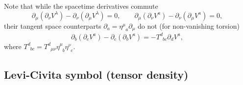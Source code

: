 \documentclass[
10pt, %
a4paper, %
oneside, %
headinclude,footinclude, %
BCOR5mm, %
]{scrartcl}
\newcommand{\itetrsymbol}{\eta}
\newcommand{\itetr}[2]{\itetrsymbol^{#1}_{\phantom{#1}#2}}
\newcommand{\rtetr}[2]{h^{#1}_{\mathsmaller{(r)} #2}}
\newcommand{\spin}[2]{\omega^{#1}_{\phantom{#1}#2}}
\newcommand{\D}[1]{\partial_{#1}} %
\newcommand{\Tors}[2]{T^{#1}_{\phantom{a}#2}}
\begin{document}
Note that while the spacetime derivatives commute
\begin{equation}\label{eqn.commut.D}
\D{\mu}(\D{\nu} V^\lambda) - \D{\nu}(\D{\mu} V^\lambda) = 0, 
\qquad 
\D{\mu}(\D{\nu} V^a) - \D{\nu}(\D{\mu} V^a) = 0,
\end{equation}
their tangent space counterparts $\D{a} =  \itetr{\mu}{a}\D{\mu}$ do not (for non-vanishing torsion)
\begin{equation}
\D{b}(\D{c} V^a) - \D{c}(\D{b} V^a) = 
-\Tors{d}{b c}\D{d}V^a,
\end{equation}
where $ \Tors{d}{bc} = \Tors{d}{\mu\nu}\itetr{\mu}{b}\itetr{\nu}{c} $.

%


\subsection{Levi-Civita symbol (tensor density)}

\end{document}
